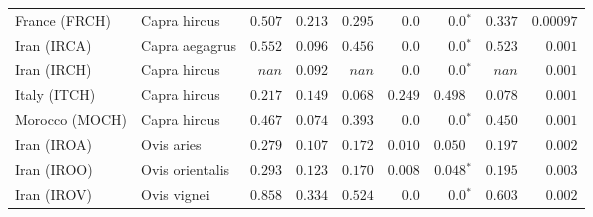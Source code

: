 \begin{center}
\begin{adjustbox}{width = 1\textwidth}
\begin{tabular}{|l|l|r|r|r|r|r|r|r|}
                  France (FRCH) &         Capra hircus &                                        $ 0.507$ &                                           $ 0.213$ &                      $ 0.295$ &            $0.0$ &                  $\bm{0.0{^*}}$ &                                           $ 0.337$ &          $0.00097$ \\
                    Iran (IRCA) &       Capra aegagrus &                                        $ 0.552$ &                                           $ 0.096$ &                      $ 0.456$ &            $0.0$ &                  $\bm{0.0{^*}}$ &                                           $ 0.523$ &           $ 0.001$ \\
                    Iran (IRCH) &         Capra hircus &                                        $   nan$ &                                           $ 0.092$ &                      $   nan$ &            $0.0$ &                  $\bm{0.0{^*}}$ &                                           $   nan$ &           $ 0.001$ \\
                   Italy (ITCH) &         Capra hircus &                                        $ 0.217$ &                                           $ 0.149$ &                      $ 0.068$ &         $ 0.249$ &                      $ 0.498~~$ &                                           $ 0.078$ &           $ 0.001$ \\
                 Morocco (MOCH) &         Capra hircus &                                        $ 0.467$ &                                           $ 0.074$ &                      $ 0.393$ &            $0.0$ &                  $\bm{0.0{^*}}$ &                                           $ 0.450$ &           $ 0.001$ \\
                    Iran (IROA) &           Ovis aries &                                        $ 0.279$ &                                           $ 0.107$ &                      $ 0.172$ &         $ 0.010$ &                      $ 0.050~~$ &                                           $ 0.197$ &           $ 0.002$ \\
                    Iran (IROO) &      Ovis orientalis &                                        $ 0.293$ &                                           $ 0.123$ &                      $ 0.170$ &         $ 0.008$ &               $\bm{ 0.048{^*}}$ &                                           $ 0.195$ &           $ 0.003$ \\
                    Iran (IROV) &          Ovis vignei &                                        $ 0.858$ &                                           $ 0.334$ &                      $ 0.524$ &            $0.0$ &                  $\bm{0.0{^*}}$ &                                           $ 0.603$ &           $ 0.002$ \\

\end{tabular}
\end{adjustbox}
\end{center}
